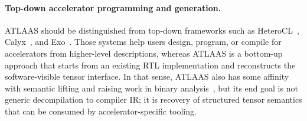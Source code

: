 \paragraph{Top-down accelerator programming and generation.}
ATLAAS should be distinguished from top-down frameworks such as HeteroCL~\cite{heterocl}, Calyx~\cite{calyx}, and Exo~\cite{exo}.
Those systems help users design, program, or compile for accelerators from higher-level descriptions, whereas ATLAAS is a bottom-up approach that starts from an existing RTL implementation and reconstructs the software-visible tensor interface.
In that sense, ATLAAS also has some affinity with semantic lifting and raising work in binary analysis~\cite{revng}, but its end goal is not generic decompilation to compiler IR; it is recovery of structured tensor semantics that can be consumed by accelerator-specific tooling.
